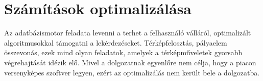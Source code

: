 \section{Számítások optimalizálása}

Az adatbázismotor feladata levenni a terhet a felhasználó válláról, 
optimalizált algoritmusokkal támogatni a lekérdezéseket. Térképfelosztás, pályaelem összevonás, ezek mind olyan feladatok,
amelyek a térképműveletek gyorsabb végrehajtását idézik elő.
Mivel a dolgozatnak egyenlőre nem célja, hogy a piacon versenyképes szoftver legyen, ezért az optimalizálás nem került bele a dolgozatba.


